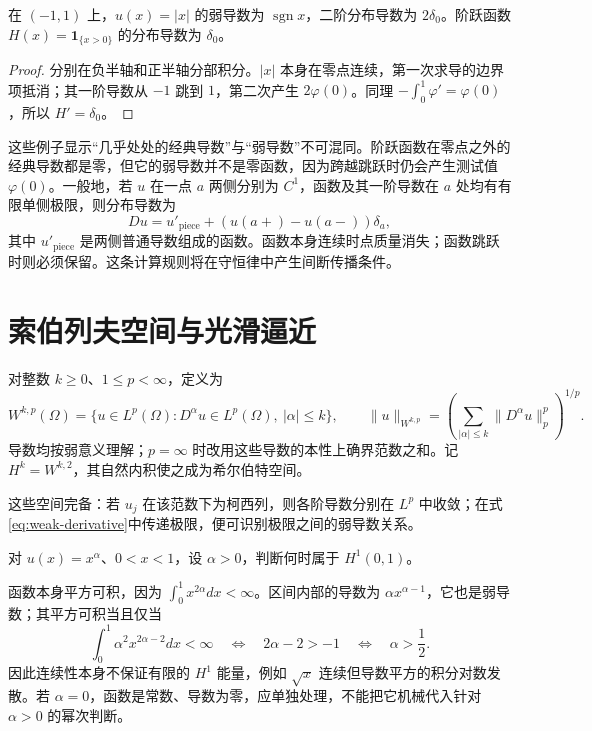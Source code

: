 \documentclass[UTF8,12pt,a4paper,fontset=fandol]{ctexbook}
\begin{document}
\begin{example}
在 $(-1,1)$ 上，$u(x)=|x|$ 的弱导数为 $\operatorname{sgn}x$，二阶分布导数为 $2\delta_0$。阶跃函数 $H(x)=\mathbf1_{\{x>0\}}$ 的分布导数为 $\delta_0$。
\end{example}
\begin{proof}
分别在负半轴和正半轴分部积分。$|x|$ 本身在零点连续，第一次求导的边界项抵消；其一阶导数从 $-1$ 跳到 $1$，第二次产生 $2\varphi(0)$。同理 $-\int_0^1\varphi'=\varphi(0)$，所以 $H'=\delta_0$。
\end{proof}

这些例子显示“几乎处处的经典导数”与“弱导数”不可混同。阶跃函数在零点之外的经典导数都是零，但它的弱导数并不是零函数，因为跨越跳跃时仍会产生测试值 $\varphi(0)$。一般地，若 $u$ 在一点 $a$ 两侧分别为 $C^1$，函数及其一阶导数在 $a$ 处均有有限单侧极限，则分布导数为
\[
 Du=u'_{\mathrm{piece}}+(u(a+)-u(a-))\delta_a,
\]
其中 $u'_{\mathrm{piece}}$ 是两侧普通导数组成的函数。函数本身连续时点质量消失；函数跳跃时则必须保留。这条计算规则将在守恒律中产生间断传播条件。

\section{索伯列夫空间与光滑逼近}
\begin{definition}
对整数 $k\ge0$、$1\le p<\infty$，定义为
\[
 W^{k,p}(\Omega)=\{u\in L^p(\Omega):D^\alpha u\in L^p(\Omega),\ |\alpha|\le k\},\qquad
 \|u\|_{W^{k,p}}=\left(\sum_{|\alpha|\le k}\|D^\alpha u\|_p^p\right)^{1/p}.
\]
导数均按弱意义理解；$p=\infty$ 时改用这些导数的本性上确界范数之和。记 $H^k=W^{k,2}$，其自然内积使之成为希尔伯特空间。
\end{definition}
这些空间完备：若 $u_j$ 在该范数下为柯西列，则各阶导数分别在 $L^p$ 中收敛；在式\eqref{eq:weak-derivative}中传递极限，便可识别极限之间的弱导数关系。

\begin{example}[尖角可以多尖]
对 $u(x)=x^\alpha$、$0<x<1$，设 $\alpha>0$，判断何时属于 $H^1(0,1)$。
\end{example}
\begin{solve}
函数本身平方可积，因为 $\int_0^1x^{2\alpha}dx<\infty$。区间内部的导数为 $\alpha x^{\alpha-1}$，它也是弱导数；其平方可积当且仅当
\[
 \int_0^1\alpha^2x^{2\alpha-2}dx<\infty
 \quad\Longleftrightarrow\quad 2\alpha-2>-1
 \quad\Longleftrightarrow\quad \alpha>\frac12.
\]
因此连续性本身不保证有限的 $H^1$ 能量，例如 $\sqrt{x}$ 连续但导数平方的积分对数发散。若 $\alpha=0$，函数是常数、导数为零，应单独处理，不能把它机械代入针对 $\alpha>0$ 的幂次判断。
\end{solve}
\end{document}
